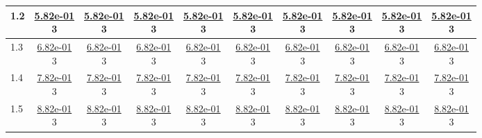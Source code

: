 \begin{table}[H]
\begin{tabular}{|l||c|c|c|c|c|c|c|c|c|}
\hline
 1.2 & \makecell{\ul{5.82e-01} \\ 3} & \makecell{\ul{5.82e-01} \\ 3} & \makecell{\ul{5.82e-01} \\ 3} & \makecell{\ul{5.82e-01} \\ 3} & \makecell{\ul{5.82e-01} \\ 3} & \makecell{\ul{5.82e-01} \\ 3} & \makecell{\ul{5.82e-01} \\ 3} & \makecell{\ul{5.82e-01} \\ 3} & \makecell{\ul{5.82e-01} \\ 3} \\
\hline
 1.3 & \makecell{\ul{6.82e-01} \\ 3} & \makecell{\ul{6.82e-01} \\ 3} & \makecell{\ul{6.82e-01} \\ 3} & \makecell{\ul{6.82e-01} \\ 3} & \makecell{\ul{6.82e-01} \\ 3} & \makecell{\ul{6.82e-01} \\ 3} & \makecell{\ul{6.82e-01} \\ 3} & \makecell{\ul{6.82e-01} \\ 3} & \makecell{\ul{6.82e-01} \\ 3} \\
\hline
 1.4 & \makecell{\ul{7.82e-01} \\ 3} & \makecell{\ul{7.82e-01} \\ 3} & \makecell{\ul{7.82e-01} \\ 3} & \makecell{\ul{7.82e-01} \\ 3} & \makecell{\ul{7.82e-01} \\ 3} & \makecell{\ul{7.82e-01} \\ 3} & \makecell{\ul{7.82e-01} \\ 3} & \makecell{\ul{7.82e-01} \\ 3} & \makecell{\ul{7.82e-01} \\ 3} \\
\hline
 1.5 & \makecell{\ul{8.82e-01} \\ 3} & \makecell{\ul{8.82e-01} \\ 3} & \makecell{\ul{8.82e-01} \\ 3} & \makecell{\ul{8.82e-01} \\ 3} & \makecell{\ul{8.82e-01} \\ 3} & \makecell{\ul{8.82e-01} \\ 3} & \makecell{\ul{8.82e-01} \\ 3} & \makecell{\ul{8.82e-01} \\ 3} & \makecell{\ul{8.82e-01} \\ 3} \\

\end{tabular}
\end{table}

